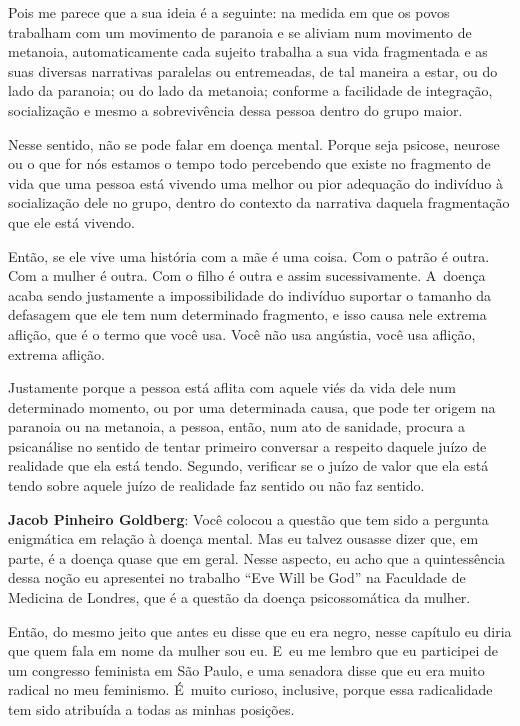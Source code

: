 Pois me parece que a sua ideia é a seguinte: na medida em que os povos
trabalham com um movimento de paranoia e se aliviam num movimento de
metanoia, automaticamente cada sujeito trabalha a sua vida fragmentada
e as suas diversas narrativas paralelas ou entremeadas, de tal maneira a
estar, ou do lado da paranoia; ou do lado da metanoia; conforme a
facilidade de integração, socialização e mesmo a sobrevivência dessa
pessoa dentro do grupo maior.

Nesse sentido, não se pode falar em doença mental. Porque seja psicose,
neurose ou o que for nós estamos o tempo todo percebendo que existe no
fragmento de vida que uma pessoa está vivendo uma melhor ou pior
adequação do indivíduo à socialização dele no grupo, dentro do contexto
da narrativa daquela fragmentação que ele está vivendo.

 

Então, se ele vive uma história com a mãe é uma coisa. Com o patrão é
outra. Com a mulher é outra. Com o filho é outra e assim sucessivamente.
A~doença acaba sendo justamente a impossibilidade do indivíduo suportar
o tamanho da defasagem que ele tem num determinado fragmento, e isso
causa nele extrema aflição, que é o termo que você usa. Você não usa
angústia, você usa aflição, extrema aflição.

 

Justamente porque a pessoa está aflita com aquele viés da vida dele num
determinado momento, ou por uma determinada causa, que pode ter origem
na paranoia ou na metanoia, a pessoa, então, num ato de sanidade, procura
a psicanálise no sentido de tentar primeiro conversar a respeito daquele
juízo de realidade que ela está tendo. Segundo, verificar se o juízo de
valor que ela está tendo sobre aquele juízo de realidade faz sentido ou
não faz sentido.

 

\textbf{Jacob Pinheiro Goldberg}: Você colocou a questão que tem sido a
pergunta enigmática em relação à doença mental. Mas eu talvez ousasse
dizer que, em parte, é a doença quase que em geral. Nesse aspecto, eu
acho que a quintessência dessa noção eu apresentei no trabalho ``Eve
Will be God'' na Faculdade de Medicina de Londres, que é a questão da
doença psicossomática da mulher.

 

Então, do mesmo jeito que antes eu disse que eu era negro, nesse capítulo
eu diria que quem fala em nome da mulher sou eu. E~eu me lembro que eu
participei de um congresso feminista em São Paulo, e uma senadora disse
que eu era muito radical no meu feminismo. É~muito curioso, inclusive,
porque essa radicalidade tem sido atribuída a todas as minhas posições.

